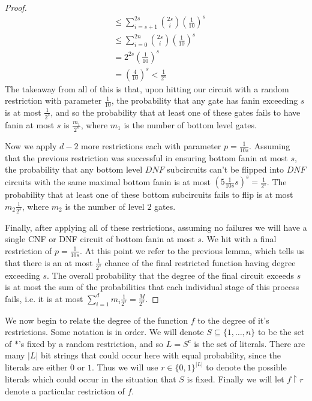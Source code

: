 \documentclass{article}
\theoremstyle{definition}
\theoremstyle{plain}
\theoremstyle{theorem}
\begin{document}
\begin{proof}
\begin{align}
		 &\leq \sum_{i=s+1}^{2s} {2s \choose i} \left( \frac{1}{10}\right)^s \\
		 &\leq \sum_{i=0}^{2n} {2s \choose i} \left(\frac{1}{10}\right)^s \\
		 &= 2^{2s}\left(\frac{1}{10}\right)^s \\
		 &= \left( \frac{4}{10} \right)^s < \frac{1}{2^s}
	\end{align}
	The takeaway from all of this is that, upon hitting our circuit with a random restriction with parameter $\frac{1}{10}$, the probability that any gate has fanin exceeding $s$ is at most $\frac{1}{2^s}$, and so the probability that at least one of these gates fails to have fanin at most $s$ is $\frac{m_1}{2^s}$, where $m_1$ is the number of bottom level gates. \par 
	Now we apply $d-2$ more restrictions each with parameter $p = \frac{1}{10s}$. Assuming that the previous restriction was successful in ensuring bottom fanin at most $s$, the probability that any bottom level $DNF$ subcircuits can't be flipped into $DNF$ circuits with the same maximal bottom fanin is at most $(5\frac{1}{10s}s)^s = \frac{1}{2^s}$. The probability that at least one of these bottom subcircuits fails to flip is at most $m_2\frac{1}{2^s}$, where $m_2$ is the number of level $2$ gates. \par 
	Finally, after applying all of these restrictions, assuming no failures we will have a single CNF or DNF circuit of bottom fanin at most $s$. We hit with a final restriction of $p = \frac{1}{10s}$. At this point we refer to the previous lemma, which tells us that there is an at most $\frac{1}{2^s}$ chance of the final restricted function having degree exceeding $s$. The overall probability that the degree of the final circuit exceeds $s$ is at most the sum of the probabilities that each individual stage of this process fails, i.e. it is at most $\sum_{i=1}^d m_i \frac{1}{2^s} = \frac{M}{2^s}$. 
\end{proof}
We now begin to relate the degree of the function $f$ to the degree of it's restrictions. Some notation is in order. We will denote $S \subseteq \{1,\ldots,n\}$ to be the set of $*$'s fixed by a random restriction, and so $L = S^c$ is the set of literals. There are many $|L|$ bit strings that could occur here with equal probability, since the literals are either $0$ or $1$. Thus we will use $r \in \{0,1\}^|L|$ to denote the possible literals which could occur in the situation that $S$ is fixed. Finally we will let $f \restriction r$ denote a particular restriction of $f$. 
\end{document}
